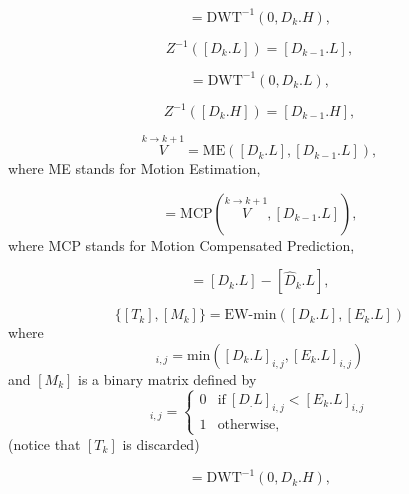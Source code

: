 \begin{equation}
  [D_k.H] = \text{DWT}^{-1}(0, D_k.H),
  \tag{b}
\end{equation}

\begin{equation}
  Z^{-1}([D_k.L]) = [D_{k-1}.L],
  \tag{c}
\end{equation}

\begin{equation}
  [D_k.L] = \text{DWT}^{-1}(0, D_k.L),
  \tag{d}
\end{equation}

\begin{equation}
  Z^{-1}([D_k.H]) = [D_{k-1}.H],
  \tag{d}
\end{equation}

\begin{equation}
  \overset{k\rightarrow k+1}{V} = \text{ME}([D_k.L], [D_{k-1}.L]),
  \tag{e}
\end{equation}
where ME stands for Motion Estimation,

\begin{equation}
  [\hat{D}_k.L] = \text{MCP}(\overset{k\rightarrow k+1}{V}, [D_{k-1}.L]),
  \tag{f}
\end{equation}
where MCP stands for Motion Compensated Prediction,

\begin{equation}
  [E_k.L] = [D_k.L] - [\hat{D}_k.L],
  \tag{g}
\end{equation}

\begin{equation}
  \{[T_k],[M_k]\} = \text{EW-min}([D_k.L], [E_k.L])
  \tag{h}
\end{equation}
where
\begin{equation}
  [T_k]_{i,j}=\text{min}([D_k.L]_{i,j}, [E_k.L]_{i,j})
\end{equation}
and $[M_k]$ is a binary matrix defined by
\begin{equation}
  [M_k]_{i,j} = \left\{
  \begin{array}{ll}
    0 & \text{if}~[D_.L]_{i,j} < [E_k.L]_{i,j} \\
    1 & \text{otherwise},
  \end{array}
  \right.
  \label{eq:matrix}
\end{equation}
(notice that $[T_k]$ is discarded)

\begin{equation}
  [D_k.H] = \text{DWT}^{-1}(0, D_k.H),
  \tag{i}
\end{equation}

